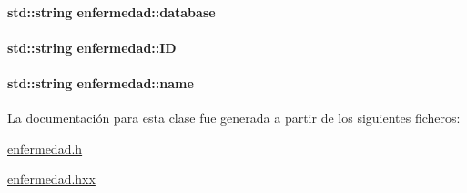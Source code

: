 \paragraph[{\texorpdfstring{database}{database}}]{\setlength{\rightskip}{0pt plus 5cm}std\+::string enfermedad\+::database\hspace{0.3cm}{\ttfamily [private]}}\hypertarget{classenfermedad_a4c33267847aebecf5bd7eb52b78e5da5}{}\label{classenfermedad_a4c33267847aebecf5bd7eb52b78e5da5}
\paragraph[{\texorpdfstring{ID}{ID}}]{\setlength{\rightskip}{0pt plus 5cm}std\+::string enfermedad\+::\+ID\hspace{0.3cm}{\ttfamily [private]}}\hypertarget{classenfermedad_ac19bf47d78f91e0c9dd3c84339d250b4}{}\label{classenfermedad_ac19bf47d78f91e0c9dd3c84339d250b4}
\paragraph[{\texorpdfstring{name}{name}}]{\setlength{\rightskip}{0pt plus 5cm}std\+::string enfermedad\+::name\hspace{0.3cm}{\ttfamily [private]}}\hypertarget{classenfermedad_a02b17e98f7d0d3ecc3e54f23fbd897da}{}\label{classenfermedad_a02b17e98f7d0d3ecc3e54f23fbd897da}


La documentación para esta clase fue generada a partir de los siguientes ficheros\+:\begin{DoxyCompactItemize}
\item 
\hyperlink{enfermedad_8h}{enfermedad.\+h}\item 
\hyperlink{enfermedad_8hxx}{enfermedad.\+hxx}\end{DoxyCompactItemize}
